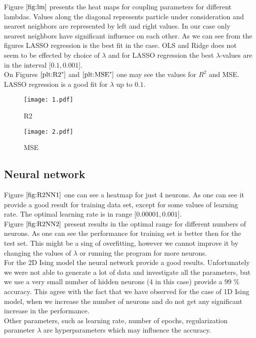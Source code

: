 \documentclass[10pt]{article}
\begin{document}
Figure $\ref{fig:lm}$ presents the heat maps for coupling parameters for different lambdas. Values along the diagonal represents particle under consideration and nearest neighbors are represented by left and right values. In our case only nearest neighbors have significant influence on each other. As we can see from the figures LASSO regression is the best fit in the case. OLS and Ridge does not seem to be effected by choice of $\lambda$ and for LASSO regression the best $\lambda$-values are in the interval $\lbrack \num{0.1} , \num{0.001} \rbrack$.\\
On Figures $\ref{plt:R2"}$ and $\ref{plt:MSE"}$ one may see the values for $R^2$ and MSE. LASSO regression is a good fit for $\lambda$ up to $ \num{0.1}$.

\begin{figure}
	\centerline{\texttt{[image: 1.pdf]}}
	\caption{R2}
	\label{plt:R2"}
\end{figure}

\begin{figure}
	\centerline{\texttt{[image: 2.pdf]}}
	\caption{MSE}
	\label{plt:MSE"}
\end{figure}

\subsection{Neural network}
Figure $\ref{fig:R2NN1}$ one can see a heatmap for just 4 neurons. As one can see it provide a good result for training data set, except for some values of learning rate. The optimal learning rate is in range $\lbrack \num{0.00001} , \num{0.001} \rbrack$.\\
Figure $\ref{fig:R2NN2}$ present results in the optimal range for different numbers of neurons. As one can see the performance for training set is better then for the test set. This might be a sing of overfitting, however we cannot improve it by changing the values of $\lambda$ or running the program for more neurons. \\
For the 2D Ising model the neural network provide a good results. Unfortunately we were not able to generate a lot of data and investigate all the parameters, but we use a very small number of hidden neurons (4 in this case) provide a 99 $\%$ accuracy. This agree with the fact that we have observed for the case of 1D Ising model, when we increase the number of neurons and do not get any significant increase in the performance. \\
Other parameters, such as learning rate, number of epochs, regularization parameter $\lambda$ are hyperparameters which may influence the accuracy.\\ 
\end{document}
